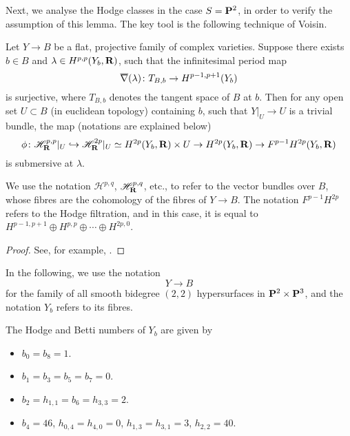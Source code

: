 Next, we analyse the Hodge classes in the case $S = \bbP^2$,
in order to verify the assumption of this lemma.
The key tool is the following technique of Voisin.

\begin{lemma} \label{lem-7-voisin}
    Let $Y \to B$ be a flat, projective family of complex varieties.
    Suppose there exists $b \in B$ and $\lambda \in H^{p,p} (Y_b, \bbR)$, 
    such that the infinitesimal period map
    \[ \nablabar (\lambda) \: T_{B,b} \to H^{p-1,p+1} (Y_b) \]
    is surjective, where $T_{B,b}$ denotes the tangent space of $B$ at $b$.
    Then for any open set $U \subset B$ \textup{(in euclidean topology)} containing $b$, 
    such that $Y|_U \to U$ is a trivial bundle, the map \textup{(notations are explained below)}
    \[ \phi \: \mathscr{H}^{p,p}_{\bbR} |_U 
        \hookrightarrow \mathscr{H}^{2p}_{\bbR} |_U 
        \simeq H^{2p} (Y_b, \bbR) \times U 
        \to H^{2p} (Y_b, \bbR) 
        \to F^{p-1} H^{2p} (Y_b, \bbR) \]
    is submersive at $\lambda$.
\end{lemma}

We use the notation $\mathscr{H}^{p,q}$, $\mathscr{H}^{p,q}_{\bbR}$, etc.,
to refer to the vector bundles over $B$,
whose fibres are the cohomology of the fibres of $Y \to B$.
The notation $F^{p-1} H^{2p}$ refers to the Hodge filtration,
and in this case, it is equal to $H^{p-1,p+1} \oplus H^{p,p} \oplus \cdots \oplus H^{2p,0}$.

\begin{proof}
    See, for example, \cite[\S5.3.4]{voisin-book-2}.
\end{proof}

In the following, we use the notation
\[ Y \to B \]
for the family of all smooth bidegree $(2,2)$ hypersurfaces in $\bbP^2 \times \bbP^3$,
and the notation $Y_b$ refers to its fibres.

\begin{proposition}
    The Hodge and Betti numbers of $Y_b$ are given by 
    \begin{itemize}
        \item
            $b_0 = b_8 = 1$.
        \item
            $b_1 = b_3 = b_5 = b_7 = 0$.
        \item
            $b_2 = h_{1,1} = b_6 = h_{3,3} = 2$.
        \item
            $b_4 = 46$, $h_{0,4} = h_{4,0} = 0$, $h_{1,3} = h_{3,1} = 3$, $h_{2,2} = 40$.
    \end{itemize}
\end{proposition}

